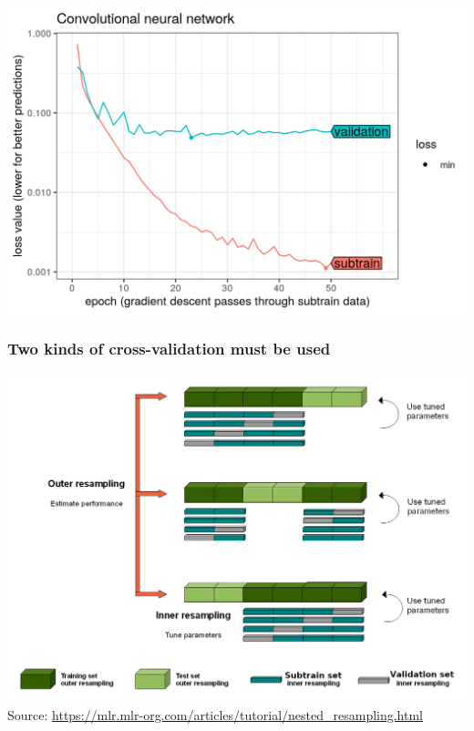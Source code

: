 \documentclass{beamer}
\begin{document}
\begin{frame}
  \includegraphics[width=\textwidth]{figure-validation-loss-conv}
\end{frame}
 
\begin{frame}
  \frametitle{Two kinds of cross-validation must be used}
  \includegraphics[width=\textwidth]{nested_resampling.png}
  Source: \url{https://mlr.mlr-org.com/articles/tutorial/nested_resampling.html}
\end{frame}
\end{document}

